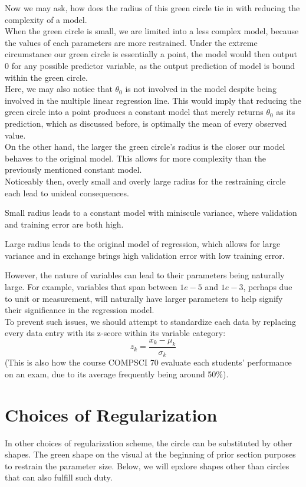 Now we may ask, how does the radius of this green circle tie in with reducing the complexity of a model. \\
When the green circle is small, we are limited into a less complex model, because the values of each parameters are more restrained. Under the extreme circumstance our green circle is essentially a point, the model would then output $0$ for any possible predictor variable, as the output prediction of model is bound within the green circle. \\
Here, we may also notice that $\theta_0$ is not involved in the model despite being involved in the multiple linear regression line. This would imply that reducing the green circle into a point produces a constant model that merely returns $\theta_0$ as its prediction, which as discussed before, is optimally the mean of every observed value. \\
On the other hand, the larger the green circle's radius is the closer our model behaves to the original model. This allows for more complexity than the previously mentioned constant model. \\
Noticeably then, overly small and overly large radius for the restraining circle each lead to unideal consequences.
\begin{bindenum}
    \item Small radius leads to a constant model with miniscule variance, where validation and training error are both high.
    \item Large radius leads to the original model of regression, which allows for large variance and in exchange brings high validation error with low training error.
\end{bindenum}

However, the nature of variables can lead to their parameters being naturally large. For example, variables that span between $1e-5$ and $1e-3$, perhaps due to unit or measurement, will naturally have larger parameters to help signify their significance in the regression model. \\
To prevent such issues, we should attempt to standardize each data by replacing every data entry with its z-score within its variable category:
\[z_k = \frac{x_k - \mu_k}{\sigma_k}\]
(This is also how the course COMPSCI 70 evaluate each students' performance on an exam, due to its average frequently being around 50\%).

\section{Choices of Regularization}
In other choices of regularization scheme, the circle can be substituted by other shapes.
The green shape on the visual at the beginning of prior section purposes to restrain the parameter size. Below, we will epxlore shapes other than circles that can also fulfill such duty. \\


